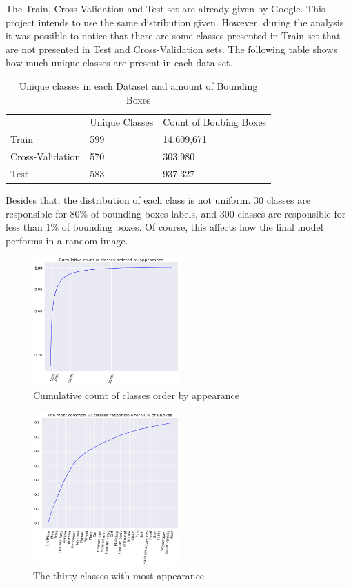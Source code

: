 \documentclass[11pt, a4paper, twocolumn]{article}
\begin{document}
The Train, Cross-Validation and Test set are already given by Google. This project intends to use the same distribution given. However, during the analysis it was possible to notice that there are some classes presented in Train set that are not presented in Test and Cross-Validation sets. The following table shows how much unique classes are present in each data set.

\begin{table}[ht]
	\footnotesize
	\centering
	\caption{ \footnotesize Unique classes in each Dataset and amount of Bounding Boxes }
	\label{table1}
	\begin{tabular}{lll}
		& Unique Classes & Count of Boubing Boxes \\
		\rowcolor[HTML]{EFEFEF} 
		Train            & 599            & 14,609,671             \\
		Cross-Validation & 570            & 303,980                \\
		\rowcolor[HTML]{EFEFEF} 
		Test             & 583            & 937,327               
	\end{tabular}
\end{table}

Besides that, the distribution of each class is not uniform. 30 classes are responsible for 80\% of bounding boxes labels, and 300 classes are responsible for less than 1\% of bounding boxes. Of course, this affects how the final model performs in a random image.

\begin{figure}[!ht]
	\centering
	\includegraphics[width=0.5\textwidth]{cumulative-classes.png}
	\caption{\scriptsize Cumulative count of classes order by appearance}
\end{figure}

\begin{figure}[!ht]
	\centering
	\includegraphics[width=0.5\textwidth]{30-most-frequently.png}
	\caption{\scriptsize The thirty classes with most appearance}
\end{figure}
\end{document}
